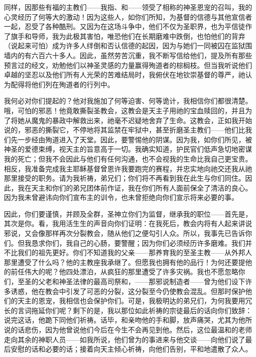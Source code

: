 同样，因那些有福的主教们——我指、和——领受了相称的神圣恩宠的召叫，我的心灵经历了何等大的激动！因为这些人，如你们所知，为基督的信德与其他宣信者一起，忍受了各种酷刑。又因为在这场斗争中，他们不仅为圣职界，也为平信徒作了旗手和导师，我为此极其害怕，唯恐他们在长期磨难中跌倒，也怕他们的背弃（说起来可怕）成为许多人绊倒和否认信德的起因，因为与她们一同被囚在监狱围墙内的有六百六十多人。因此，虽然劳苦沉重，我不断写信给他们，提及所有那些预言过的经文，劝勉他们以神圣灵感的力量赢得殉道者的棕榈枝。但当我听说他们卓越的坚忍以及他们所有人光荣的苦难结局时，我俯伏在地钦崇基督的尊严，祂认为配得将他们列在殉道者的行列中。\par

我何必对你们提起的？他对我施加了何等迫害、何等诡计，我相信你们都很清楚。哦，可怕的邪恶！他竟敢撕裂圣教会，这教会是天主子用祂的宝血赎回的，并且为了将她从魔鬼的暴政中解救出来，祂毫不迟疑地舍弃了生命。这教会，正如我开始说的，邪恶的撕裂它，不停地将其监禁在牢狱中，甚至折磨圣主教们——他们比我们先一步经由殉道进入了天堂。因此，要警惕他的阴谋。因为我，如你们所见，被神圣的爱德束缚，视天主的旨意高于一切。我确实知道，护民官们低声急切地密谋我的死亡；但我不会因此与他们有任何沟通，也不会视我的生命比我自己更宝贵。相反，我准备完成我主耶稣基督曾恩许我要跑完的赛程，并忠实地向祂交还我从祂那里接受的职务。请为我祈祷，弟兄们；你们将不再看到我在此生与你们同住。因此，我在天主和你们的弟兄团体前作证，我在你们所有人面前保全了清洁的良心。因为我未曾避讳向你们宣布主的训令，也未曾拒绝向你们宣示将来必要的事。\par

因此，你们要谨慎，并顾及全群，圣神立你们为监督，继承我的职位——首先是，其次是你。看，我用活生生的声音向你们证明：在我死后，教会内将有人起来讲说邪说，又会像那样再次分裂教会，随从他们之便勾引人众。所以，我事先已告诉你们。但我恳求你们，我自己的心肠，要警醒；因为你们必须经历许多磨难。我们并不比我们的祖先更好。你们不知道我的父亲——那养育我的至圣主教——从外邦人那里遭受了什么吗？他的主教座我承继了。但愿我也拥有他的品行！为何还要提他的前任伟大的呢？他四处漂泊，从疯狂的那里遭受了许多灾祸。我也不愿忽略你们，至圣的父老和神圣法律的最高司祭和，——那邪说制造者——曾为他们设下许多诱惑，他在教会中引发了可恶的分裂，这分裂至今仍使教会混乱。但那时保护他们的天主的恩宠，我相信也会保护你们。可是，我极明达的弟兄们，为何我要用冗长的言词拖延你们呢？剩下的是，我以那位如此祈祷的宗徒最后的话向你们致辞：说完这话，他跪下同他们祈祷。话毕，和亲吻他的手和脚，放声痛哭，尤其为他所说的话悲伤，因为他曾说他们今后在今生不会再见到他。然后，这位最温和的老师走向其余的神职人员——如我所说，他们曾为的事进来与他交谈——向他们说了最后安慰的话和必要的话；接着向天主倾心祈祷，向他们告别，平和地遣散了众人。\par


